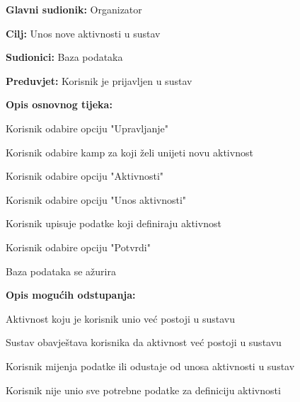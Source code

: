 					\noindent {}
					\begin{packed_item}
						
						\item \textbf{Glavni sudionik: }Organizator
						\item  \textbf{Cilj:} Unos nove aktivnosti u sustav
						\item  \textbf{Sudionici:} Baza podataka
						\item  \textbf{Preduvjet:} Korisnik je prijavljen u sustav
						\item  \textbf{Opis osnovnog tijeka:}
						
						\item[] \begin{packed_enum}
							
							\item Korisnik odabire opciju "Upravljanje"
							\item Korisnik odabire kamp za koji želi unijeti novu aktivnost
							\item Korisnik odabire opciju "Aktivnosti"
							\item Korisnik odabire opciju "Unos aktivnosti"
							\item Korisnik upisuje podatke koji definiraju aktivnost
							\item Korisnik odabire opciju "Potvrdi"
							\item Baza podataka se ažurira
						\end{packed_enum}
						
						\item  \textbf{Opis mogućih odstupanja:}
						
						\item[] \begin{packed_item}
							
							\item[6.a] Aktivnost koju je korisnik unio već postoji u sustavu
							\item[] \begin{packed_enum}
								
							\item Sustav obavještava korisnika da aktivnost već postoji u sustavu
							\item Korisnik mijenja podatke ili odustaje od unosa aktivnosti u sustav
							
								
							\end{packed_enum}
							\item[6.b] Korisnik nije unio sve potrebne podatke za definiciju aktivnosti
							\item[] \begin{packed_enum}
								

\end{packed_enum}
\end{packed_item}
\end{packed_item}

